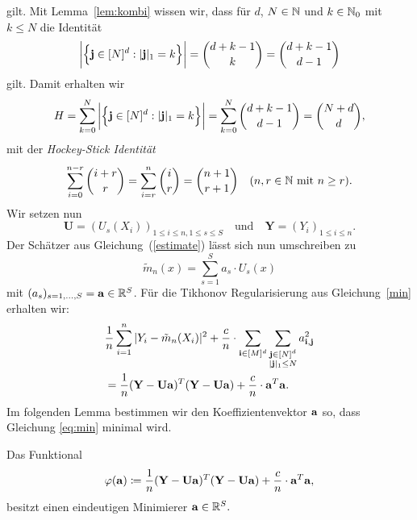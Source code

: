 gilt. Mit Lemma~\ref{lem:kombi} wissen wir, dass für $d$, $N \in \mathbb{N}$ und $k \in \mathbb{N}_0$ mit $k \leq N$ die Identität
$$\bigg|\Bigl\{\mathbf{j} \in [N]^d : |\mathbf{j}|_1 = k \Bigr\}\bigg| = \binom{d + k - 1}{k} = \binom{d + k - 1}{d - 1}$$ gilt.
Damit erhalten wir
$$H = \sum_{k = 0}^N \bigg|\Bigl\{\mathbf{j} \in [N]^d : |\mathbf{j}|_1 = k \Bigr\}\bigg|= \sum_{k = 0}^N \binom{d + k - 1}{d - 1} = \binom{N + d}{d},$$
mit der \emph{Hockey-Stick Identität} 
$$\sum_{i = 0}^{n-r} \binom{i + r}{r} = \sum_{i = r}^n \binom{i}{r} = \binom{n + 1}{r + 1} \quad (n, r \in \mathbb{N}  \text{ mit  } n \geq r).$$
Wir setzen nun 
$$ \mathbf{U} = (U_s(X_i))_{1\leq i \leq n,1\leq s \leq S} \quad \text{und} \quad \mathbf{Y} = (Y_i)_{1 \leq i \leq n}.$$
Der Schätzer aus Gleichung~(\ref{estimate}) lässt sich nun umschreiben zu 
\begin{equation}
\label{umschreiben}
\tilde{m}_n(x) = \sum_{s = 1}^S a_s \cdot U_s(x)
\end{equation}
mit $(a_s)_{s = 1,\dots,S} = \mathbf{a}\in \mathbb{R}^S$.
Für die Tikhonov Regularisierung aus Gleichung~\eqref{min} erhalten wir:
\begin{equation}
\label{eq:min}
\begin{split}
& \frac{1}{n} \sum_{i = 1}^n|Y_i - \tilde{m}_n(X_i)|^2 + \frac{c}{n} \cdot \sum_{\mathbf{i} \in [M]^d} \sum_{\substack{\mathbf{j} \in [N]^d\\|\mathbf{j}|_1 \leq N}} a_{\mathbf{i},\mathbf{j}}^2 \\
& = \frac{1}{n}(\mathbf{Y} - \mathbf{U}\mathbf{a})^T(\mathbf{Y} - \mathbf{U}\mathbf{a}) + \frac{c}{n} \cdot \mathbf{a}^T\mathbf{a}.
\end{split}
\end{equation}
Im folgenden Lemma bestimmen wir den Koeffizientenvektor $\mathbf{a}$ so, dass Gleichung \eqref{eq:min} minimal wird.
\begin{lem}
\label{mincoef}
Das Funktional 
$$
\varphi(\mathbf{a}) \coloneqq \frac{1}{n}(\mathbf{Y} - \mathbf{U}\mathbf{a})^T(\mathbf{Y} - \mathbf{U}\mathbf{a}) + \frac{c}{n} \cdot \mathbf{a}^T\mathbf{a},
$$
besitzt einen eindeutigen Minimierer $\mathbf{a} \in \mathbb{R}^S.$
\end{lem}
